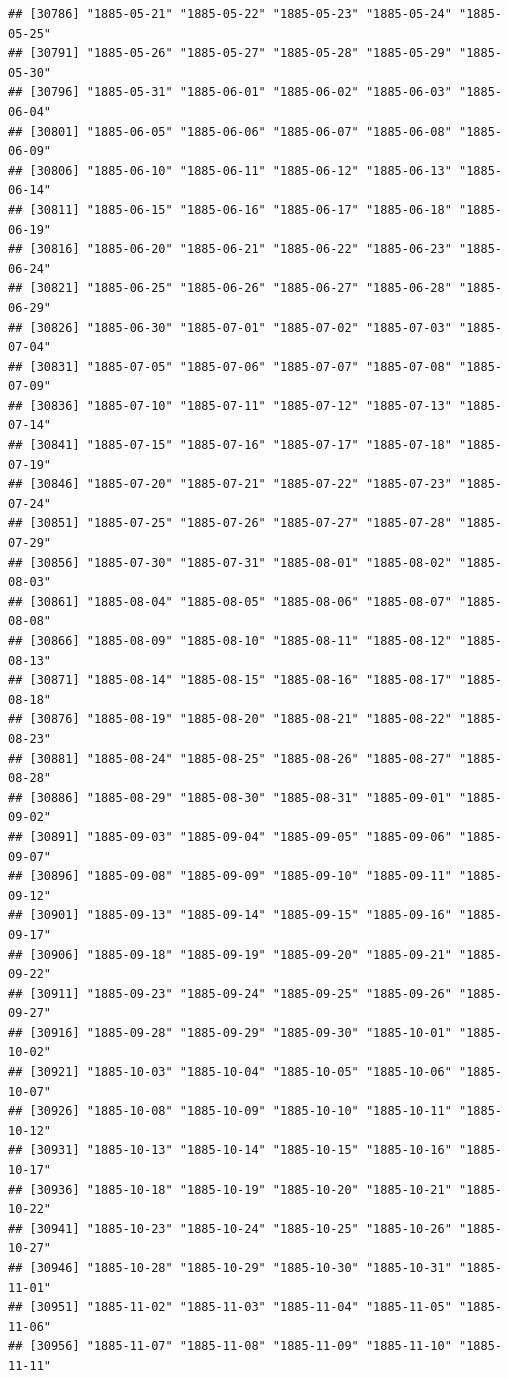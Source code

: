 \documentclass{article}\usepackage[]{graphicx}\usepackage[]{color}
\makeatletter
\newenvironment{kframe}{%
 \def\at@end@of@kframe{}%
 \ifinner\ifhmode%
  \def\at@end@of@kframe{\end{minipage}}%
  \begin{minipage}{\columnwidth}%
 \fi\fi%
 \def\FrameCommand##1{\hskip\@totalleftmargin \hskip-\fboxsep
 \colorbox{shadecolor}{##1}\hskip-\fboxsep
     \hskip-\linewidth \hskip-\@totalleftmargin \hskip\columnwidth}%
 \MakeFramed {\advance\hsize-\width
   \@totalleftmargin\z@ \linewidth\hsize
   \@setminipage}}%
 {\par\unskip\endMakeFramed%
 \at@end@of@kframe}
\newenvironment{knitrout}{}{} %
\makeatother
\begin{document}
\begin{description}
\begin{knitrout}
\begin{kframe}
\begin{verbatim}
## [30786] "1885-05-21" "1885-05-22" "1885-05-23" "1885-05-24" "1885-05-25"
## [30791] "1885-05-26" "1885-05-27" "1885-05-28" "1885-05-29" "1885-05-30"
## [30796] "1885-05-31" "1885-06-01" "1885-06-02" "1885-06-03" "1885-06-04"
## [30801] "1885-06-05" "1885-06-06" "1885-06-07" "1885-06-08" "1885-06-09"
## [30806] "1885-06-10" "1885-06-11" "1885-06-12" "1885-06-13" "1885-06-14"
## [30811] "1885-06-15" "1885-06-16" "1885-06-17" "1885-06-18" "1885-06-19"
## [30816] "1885-06-20" "1885-06-21" "1885-06-22" "1885-06-23" "1885-06-24"
## [30821] "1885-06-25" "1885-06-26" "1885-06-27" "1885-06-28" "1885-06-29"
## [30826] "1885-06-30" "1885-07-01" "1885-07-02" "1885-07-03" "1885-07-04"
## [30831] "1885-07-05" "1885-07-06" "1885-07-07" "1885-07-08" "1885-07-09"
## [30836] "1885-07-10" "1885-07-11" "1885-07-12" "1885-07-13" "1885-07-14"
## [30841] "1885-07-15" "1885-07-16" "1885-07-17" "1885-07-18" "1885-07-19"
## [30846] "1885-07-20" "1885-07-21" "1885-07-22" "1885-07-23" "1885-07-24"
## [30851] "1885-07-25" "1885-07-26" "1885-07-27" "1885-07-28" "1885-07-29"
## [30856] "1885-07-30" "1885-07-31" "1885-08-01" "1885-08-02" "1885-08-03"
## [30861] "1885-08-04" "1885-08-05" "1885-08-06" "1885-08-07" "1885-08-08"
## [30866] "1885-08-09" "1885-08-10" "1885-08-11" "1885-08-12" "1885-08-13"
## [30871] "1885-08-14" "1885-08-15" "1885-08-16" "1885-08-17" "1885-08-18"
## [30876] "1885-08-19" "1885-08-20" "1885-08-21" "1885-08-22" "1885-08-23"
## [30881] "1885-08-24" "1885-08-25" "1885-08-26" "1885-08-27" "1885-08-28"
## [30886] "1885-08-29" "1885-08-30" "1885-08-31" "1885-09-01" "1885-09-02"
## [30891] "1885-09-03" "1885-09-04" "1885-09-05" "1885-09-06" "1885-09-07"
## [30896] "1885-09-08" "1885-09-09" "1885-09-10" "1885-09-11" "1885-09-12"
## [30901] "1885-09-13" "1885-09-14" "1885-09-15" "1885-09-16" "1885-09-17"
## [30906] "1885-09-18" "1885-09-19" "1885-09-20" "1885-09-21" "1885-09-22"
## [30911] "1885-09-23" "1885-09-24" "1885-09-25" "1885-09-26" "1885-09-27"
## [30916] "1885-09-28" "1885-09-29" "1885-09-30" "1885-10-01" "1885-10-02"
## [30921] "1885-10-03" "1885-10-04" "1885-10-05" "1885-10-06" "1885-10-07"
## [30926] "1885-10-08" "1885-10-09" "1885-10-10" "1885-10-11" "1885-10-12"
## [30931] "1885-10-13" "1885-10-14" "1885-10-15" "1885-10-16" "1885-10-17"
## [30936] "1885-10-18" "1885-10-19" "1885-10-20" "1885-10-21" "1885-10-22"
## [30941] "1885-10-23" "1885-10-24" "1885-10-25" "1885-10-26" "1885-10-27"
## [30946] "1885-10-28" "1885-10-29" "1885-10-30" "1885-10-31" "1885-11-01"
## [30951] "1885-11-02" "1885-11-03" "1885-11-04" "1885-11-05" "1885-11-06"
## [30956] "1885-11-07" "1885-11-08" "1885-11-09" "1885-11-10" "1885-11-11"

\end{verbatim}
\end{kframe}
\end{knitrout}
\end{description}
\end{document}
